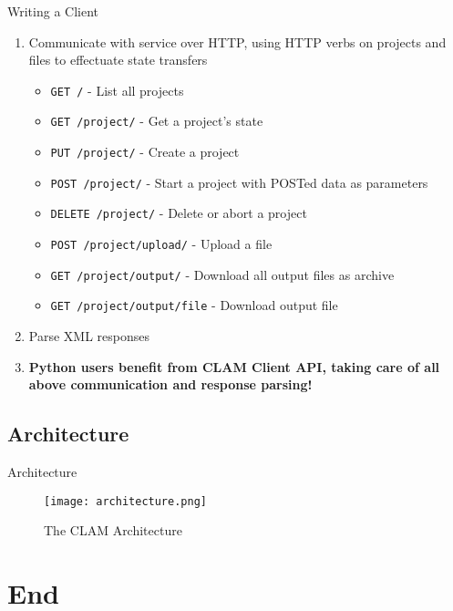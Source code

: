 \documentclass[compress]{beamer}
\begin{document}
\begin{frame}
    \begin{block}{Writing a Client}
        \begin{enumerate}
            \item Communicate with service over HTTP, using HTTP verbs on projects and files to effectuate state transfers 
            \begin{itemize}
                \item \texttt{GET /} - List all projects
                \item \texttt{GET /project/} - Get a project's state
                \item \texttt{PUT /project/} - Create a project
                \item \texttt{POST /project/} - Start a project with POSTed data as parameters
                \item \texttt{DELETE /project/} - Delete or abort a project
                \item \texttt{POST /project/upload/} - Upload a file
                \item \texttt{GET /project/output/} - Download all output files as archive
                \item \texttt{GET /project/output/file} - Download output file
            \end{itemize}
            \item Parse XML responses
            \item \textbf{Python users benefit from CLAM Client API, taking care of all above communication and response parsing!}
        \end{enumerate}
    \end{block}

\end{frame}


\subsection{Architecture}

\begin{frame}
    \begin{block}{Architecture}
        \begin{figure}[h]
        \begin{center}
        \texttt{[image: architecture.png]}
        \end{center}
        \caption{The CLAM Architecture}
        \label{fig:arch} 
        \end{figure}

    \end{block}
\end{frame}

\section{End}


\begin{frame}
    \raccoon
\end{frame}
\end{document}
